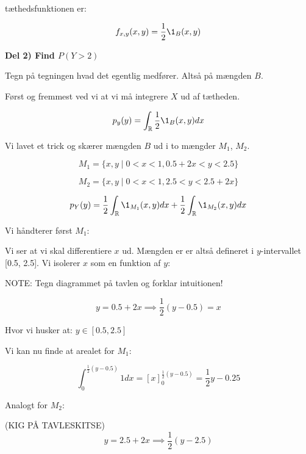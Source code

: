 tæthedsfunktionen er:

\begin{equation}
    f_{x,y}(x,y) = \frac{1}{2}\1_{B}(x,y)
\end{equation}

\textbf{Del 2) Find $P(Y>2)$}

Tegn på tegningen hvad det egentlig medfører. Altså på mængden $B$.

Først og fremmest ved vi at vi må integrere $X$ ud af tætheden.

\begin{equation}
    p_y(y) = \int_{\R} \frac{1}{2}\1_{B}(x,y) dx
\end{equation}

Vi lavet et trick og skærer mængden $B$ ud i to mængder $M_1$, $M_2$.

\begin{equation}
    M_1 = \{x, y \mid 0 < x <1, 0.5 + 2x < y < 2.5\}
\end{equation}

\begin{equation}
    M_2 = \{x,y \mid 0 < x < 1, 2.5 < y < 2.5 + 2x\} 
\end{equation}

\begin{equation}
    p_Y (y) = \frac{1}{2}\int_\R \1_{M_1} (x,y) dx + \frac{1}{2}\int_\R \1_{M_2} (x,y) dx 
\end{equation}

Vi håndterer først $M_1$:

Vi ser at vi skal differentiere $x$ ud. Mængden er er altså defineret i $y$-intervallet [0.5, 2.5]. Vi isolerer $x$ som en funktion af $y$:

NOTE: Tegn diagrammet på tavlen og forklar intuitionen!

\begin{equation}
    y = 0.5 + 2x \implies \frac{1}{2}(y - 0.5) = x
\end{equation}

Hvor vi husker at: $y \in [0.5, 2.5]$

Vi kan nu finde at arealet for $M_1:$

\begin{equation}
    \int_{0}^{\frac{1}{2}(y-0.5)} 1 dx = [x]_{0}^{\frac{1}{2}(y-0.5)} = \frac{1}{2}y - 0.25
\end{equation}

Analogt for $M_2$:

(KIG PÅ TAVLESKITSE)
\begin{equation}
    y = 2.5 + 2x \implies \frac{1}{2}(y - 2.5) 
\end{equation}

